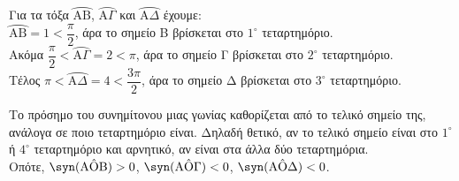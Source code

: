 \begin{alist}
\item Για τα τόξα $\wideparen{\text{AB}}$, $\wideparen{\text{A}\Gamma}$ και $\wideparen{\text{A}\Delta}$ έχουμε: \\
$\wideparen{\text{AB}} = 1 < \dfrac{\pi}{2}$, άρα το σημείο Β βρίσκεται στο $1^\circ$ τεταρτημόριο. \\
Ακόμα $\dfrac{\pi}{2} < \wideparen{\text{A}\Gamma} = 2 < \pi$, άρα το σημείο Γ βρίσκεται στο $2^\circ$ τεταρτημόριο. \\
Τέλος $\pi < \wideparen{\text{A}\Delta} = 4 < \dfrac{3\pi}{2}$, άρα το σημείο Δ βρίσκεται στο $3^\circ$ τεταρτημόριο.
\item Το πρόσημο του συνημίτονου μιας γωνίας καθορίζεται από το τελικό σημείο της, ανάλογα σε ποιο τεταρτημόριο είναι. Δηλαδή θετικό, αν το τελικό σημείο είναι στο $1^\circ$ ή $4^\circ$ τεταρτημόριο και αρνητικό, αν είναι στα άλλα δύο τεταρτημόρια. \\
Οπότε, $\syn (\text{A}\hat{\text{O}}\text{B}) > 0$, $\syn (\text{A}\hat{\text{O}}\Gamma) < 0$, $\syn (\text{A}\hat{\text{O}}\Delta) < 0$.
\end{alist}
\begin{center}
\end{center}

